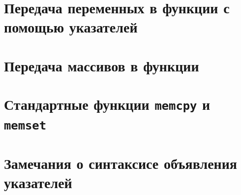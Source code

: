 \documentclass{article}
\begin{document}
\newpage
\section*{Передача переменных в функции с помощью указателей}

\section*{Передача массивов в функции}

\section*{Стандартные функции \texttt{memcpy} и \texttt{memset}}

\section*{Замечания о синтаксисе объявления указателей}
\end{document}
